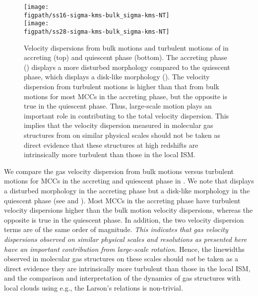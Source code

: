 \IfFileExists{emulateapjlegacy.cls}{\documentclass[iop]{emulateapjlegacy}}{\documentclass[iop]{emulateapj}}
\def\figpath{./Fig}
\begin{document}
\begin{figure}
\centering
\texttt{[image: \\figpath/ss16-sigma-kms-bulk\_sigma-kms-NT]} \\
\texttt{[image: \\figpath/ss28-sigma-kms-bulk\_sigma-kms-NT]}
\caption{Velocity dispersions from bulk motions and turbulent motions of \flower in accreting (top) and 
quiescent phase (bottom). The accreting phase () displays a more disturbed morphology compared to the 
quiescent phase, which displays a disk-like morphology (). 
The velocity dispersion from turbulent motions is higher than that from bulk motions for most MCCs in the accreting phase, but 
the opposite is true in the quiescent phase. Thus, large-scale motion plays an important role in contributing to the total velocity dispersion. 
This implies that the velocity dispersion measured in molecular gas structures from \obs on similar physical scales 
should not be taken as direct evidence that these structures at high redshifts are intrinsically more turbulent than those in the local ISM.
\label{fig:vv}}
\vspace{0.5em}
\end{figure}

We compare the gas velocity dispersion from bulk motions versus turbulent motions for MCCs in the accreting 
and quiescent phase in . We note that \flower displays a disturbed morphology in the accreting phase 
but a disk-like morphology in the quiescent phase 
(see  and ). 
Most MCCs in the accreting phase have turbulent velocity dispersions higher than the bulk motion velocity dispersions,
whereas the opposite is true in the quiescent phase. In addition, the two velocity dispersion terms are of the same order of magnitude. 
{\em This indicates that gas velocity dispersions observed on similar physical scales and resolutions as presented here 
have an important contribution from large-scale rotation.} Hence, the linewidths observed in \highz molecular gas structures 
on these scales should {\em not} be taken as a direct evidence they are intrinsically more turbulent than those in the local ISM,
and the comparison and interpretation of the dynamics of gas structures with local clouds using e.g., the Larson's relations is non-trivial.
\end{document}
